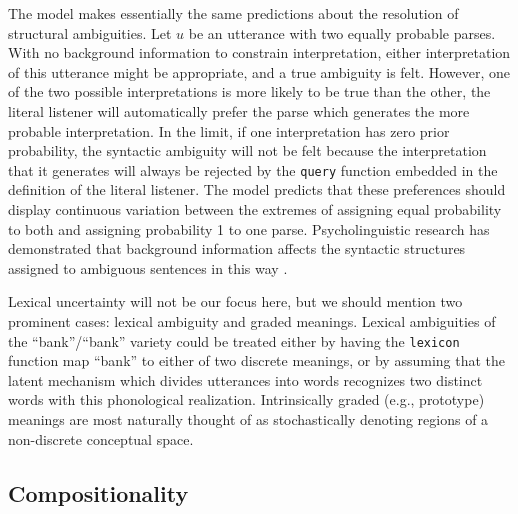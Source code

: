 \documentclass[pdfextras]{handbook}
\begin{document}
The model makes essentially the same predictions about the resolution of structural ambiguities. Let $u$ be an utterance with two equally probable parses.
With no background information to constrain interpretation, either interpretation of this utterance might be appropriate, and a true ambiguity is felt. 
However, one of the two possible interpretations is more likely to be true than the other, the literal listener will automatically prefer the parse which generates the more probable interpretation.
In the limit, if one interpretation has zero prior probability, the syntactic ambiguity will not be felt because the interpretation that it generates will always be rejected by the \lstinline{query} function embedded in the definition of the literal listener.
The model predicts that these preferences should display continuous variation between the extremes of assigning equal probability to both and assigning probability 1 to one parse.
Psycholinguistic research has demonstrated that background information affects the syntactic structures assigned to ambiguous sentences in this way \citep{crainsteedman85,altmannsteedman88,spiveyetal02}.

Lexical uncertainty will not be our focus here, but we should mention two prominent cases: lexical ambiguity and graded meanings. 
Lexical ambiguities of the ``bank''/``bank'' variety could be treated either by having the \lstinline{lexicon} function map ``bank'' to either of two discrete meanings, or by assuming that the latent mechanism which divides utterances into words recognizes two distinct words with this phonological realization.
Intrinsically graded (e.g., prototype) meanings are most naturally thought of as stochastically denoting regions of a non-discrete conceptual space. 


\subsection{Compositionality}

\end{document}
